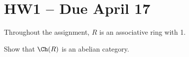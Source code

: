 \documentclass[12pt]{article}
\begin{document}

\newpage
\section{HW1 -- Due April 17}
Throughout the assignment, $R$ is an associative ring with 1.
\begin{prob}
	Show that $\Ch(R)$ is an abelian category.
\end{prob}
\end{document}
